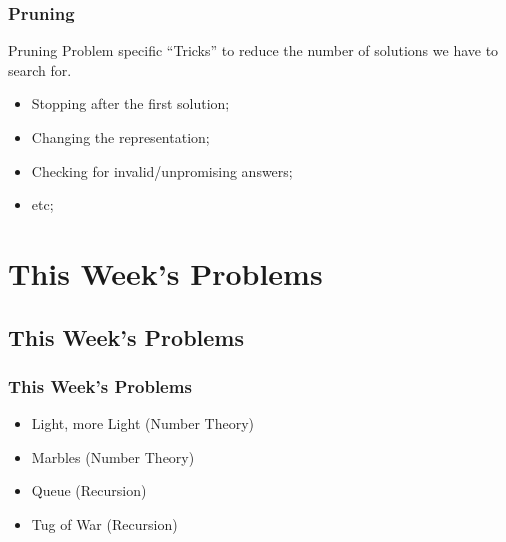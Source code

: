 \documentclass{beamer}
\begin{document}
\begin{frame}
  \frametitle{Pruning}

  \begin{block}{Pruning}
    Problem specific ``Tricks'' to reduce the number of solutions we
    have to search for.
  \end{block}

  \begin{itemize}
  \item Stopping after the first solution;
  \item Changing the representation;
  \item Checking for invalid/unpromising answers;
  \item etc;
  \end{itemize}
\end{frame}

\section{This Week's Problems}
\subsection{This Week's Problems}
\begin{frame}
  \frametitle{This Week's Problems}
  \begin{itemize}
    \item Light, more Light (Number Theory)
    \item Marbles (Number Theory)
    \item Queue (Recursion)
    \item Tug of War (Recursion)
  \end{itemize}
\end{frame}
\end{document}
